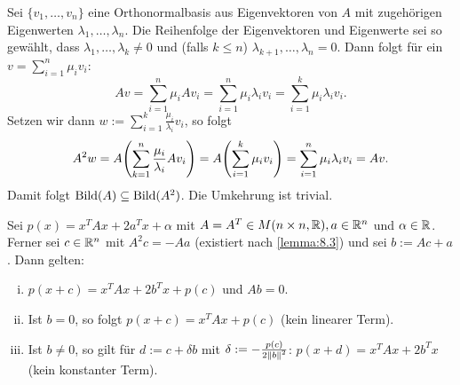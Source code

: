 \begin{beweis}
	Sei $\{v_1,\dots,v_n\}$ eine Orthonormalbasis aus Eigenvektoren von $A$ mit zugehörigen Eigenwerten $\lambda_1,\dots,\lambda_n$.
	Die Reihenfolge der Eigenvektoren und Eigenwerte sei so gewählt, dass $\lambda_1,\dots,\lambda_k \neq 0$ und (falls $k \leq n$) $\lambda_{k+1}, \dots, \lambda_n = 0$.
	Dann folgt für ein $v = \sum_{i=1}^{n} \mu_i v_i$:
	\[
		Av = \sum_{i=1}^{n} \mu_i Av_i = \sum_{i=1}^{n} \mu_i \lambda_i v_i = \sum_{i=1}^{k} \mu_i \lambda_i v_i.
	\]
	Setzen wir dann $w := \sum_{i=1}^{k} \frac{\mu_i}{\lambda_i} v_i$, so folgt
	\[
		A^2w = A \enb{\sum_{k=1}^{n} \frac{\mu_i}{\lambda_i} Av_i} = A \enb{\sum_{i=1}^{k} \mu_i v_i} = \sum_{i=1}^{n} \mu_i \lambda_i v_i = Av.
	\]
	Damit folgt $\operatorname{Bild}(A) \subseteq \operatorname{Bild}(A^2)$.
	Die Umkehrung ist trivial. \qedhere
\end{beweis}

\begin{lemma}
	\label{lemma:8.4}
	Sei $p(x) = x^T A x + 2a^Tx + \alpha$ mit $A = A^T \in M(n \times n, \mathbb{R}), a \in \mathbb{R}^n$ und $\alpha \in \mathbb{R}$.
	Ferner sei $c \in \mathbb{R}^n$ mit $A^2c = -Aa$ (existiert nach \autoref{lemma:8.3}) und sei $b := Ac + a$.
	Dann gelten:
	\begin{enumerate}[(i)]
		\item $p(x+c) = x^T Ax + 2b^Tx + p(c)$ und $Ab = 0$.
		\item Ist $b = 0$, so folgt $p(x+c) = x^TAx + p(c)$ (kein linearer Term).
		\item Ist $b \neq 0$, so gilt für $d := c+\delta b$ mit $\delta := - \frac{p(c)}{2 \left\lVert b\right\rVert^2}$: $p(x+d) = x^TAx + 2b^Tx$ (kein konstanter Term).
	\end{enumerate}
\end{lemma}

